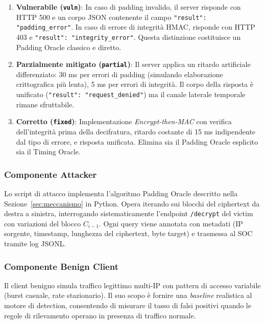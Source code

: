 \documentclass[12pt,a4paper]{article}
\begin{document}
\begin{enumerate}
  \item \textbf{Vulnerabile (\texttt{vuln})}: In caso di padding invalido, il server risponde
        con HTTP 500 e un corpo JSON contenente il campo \texttt{"result": "padding\_error"}.
        In caso di errore di integrità HMAC, risponde con HTTP 403 e
        \texttt{"result": "integrity\_error"}. Questa distinzione costituisce un Padding Oracle
        classico e diretto.

  \item \textbf{Parzialmente mitigato (\texttt{partial})}: Il server applica un ritardo
        artificiale differenziato: 30 ms per errori di padding (simulando elaborazione
        crittografica più lenta), 5 ms per errori di integrità. Il corpo della risposta
        è unificato (\texttt{"result": "request\_denied"}) ma il canale laterale temporale
        rimane sfruttabile.

  \item \textbf{Corretto (\texttt{fixed})}: Implementazione \emph{Encrypt-then-MAC} con
        verifica dell'integrità prima della decifratura, ritardo costante di 15 ms
        indipendente dal tipo di errore, e risposta unificata. Elimina sia il Padding Oracle
        esplicito sia il Timing Oracle.
\end{enumerate}

\subsubsection{Componente Attacker}

Lo script di attacco implementa l'algoritmo Padding Oracle descritto nella
Sezione~\ref{sec:meccanismo} in Python. Opera iterando sui blocchi del ciphertext da destra
a sinistra, interrogando sistematicamente l'endpoint \texttt{/decrypt} del victim con
variazioni del blocco $C_{i-1}$. Ogni query viene annotata con metadati (IP sorgente,
timestamp, lunghezza del ciphertext, byte target) e trasmessa al SOC tramite log JSONL.

\subsubsection{Componente Benign Client}

Il client benigno simula traffico legittimo multi-IP con pattern di accesso variabile
(burst casuale, rate stazionario). Il suo scopo è fornire una \emph{baseline} realistica
al motore di detection, consentendo di misurare il tasso di falsi positivi quando le
regole di rilevamento operano in presenza di traffico normale.
\end{document}
